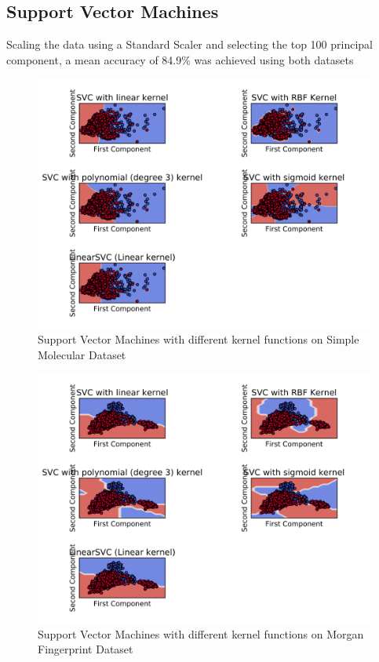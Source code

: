 \documentclass[a4paper,12pt]{report}
\begin{document}
		\subsection{Support Vector Machines}
				Scaling the data using a Standard Scaler and selecting the top 100 principal component, a mean accuracy of 84.9\% was achieved using both datasets
				\begin{figure}[H]
					\centering
					\includegraphics[width=\textwidth,scale=1,totalheight=0.4\textheight]{images/mol_decision_svm}
					\caption{Support Vector Machines with different kernel functions on Simple Molecular Dataset}
					\label{fig:svm_mol}
				\end{figure}
				\begin{figure}[H]
					\centering
					\includegraphics[width=\textwidth,scale=1,totalheight=0.4\textheight]{images/fps_decision_svm}
					\caption{Support Vector Machines with different kernel functions on Morgan Fingerprint Dataset}
					\label{fig:svm_fps}
				\end{figure}
\end{document}

